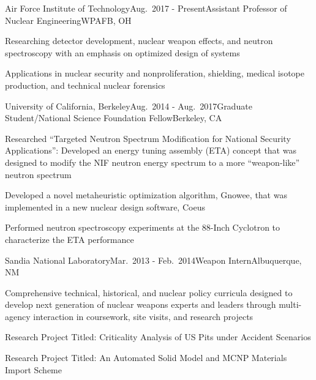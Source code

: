 \begin{rSubsection}{Air Force Institute of Technology}{Aug.\ 2017 - Present}{Assistant Professor of Nuclear Engineering}{WPAFB, OH}
\item Researching detector development, nuclear weapon effects, and neutron spectroscopy with an emphasis on optimized design of systems
\item Applications in nuclear security and nonproliferation, shielding, medical isotope production, and technical nuclear forensics
\end{rSubsection}

\begin{rSubsection}{University of California, Berkeley}{Aug.\ 2014 - Aug.\ 2017}{Graduate Student/National Science Foundation Fellow}{Berkeley, CA}
\item Researched \enquote{Targeted Neutron Spectrum Modification for National Security Applications}: Developed an energy tuning assembly (ETA) concept that was designed to modify the NIF neutron energy spectrum to a more \enquote{weapon-like} neutron spectrum
\item Developed a novel metaheuristic optimization algorithm, Gnowee, that was implemented in a new nuclear design software, Coeus
\item Performed neutron spectroscopy experiments at the 88-Inch Cyclotron to characterize the ETA performance
\end{rSubsection}


\begin{rSubsection}{Sandia National Laboratory}{Mar.\ 2013 - Feb.\ 2014}{Weapon Intern}{Albuquerque, NM}
\item Comprehensive technical, historical, and nuclear policy curricula designed to develop next generation of nuclear weapons experts and leaders through multi-agency interaction in coursework, site visits, and research projects
\item Research Project Titled: Criticality Analysis of US Pits under Accident Scenarios
\item Research Project Titled: An Automated Solid Model and MCNP Materials Import Scheme
\end{rSubsection}


